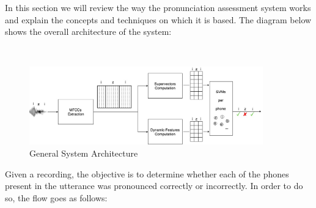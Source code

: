 In this section we will review the way the pronunciation assessment system works
and explain the concepts and techniques on which it is based. The diagram below
shows the overall architecture of the system:

~

\begin{figure}[H]
	\centering
	\includegraphics[width=0.9\textwidth]{files/figures/method/arquitectura_sistema_compuesto_v4.jpg}
	\caption{General System Architecture}
	\label{fig:methodGeneralArchitecture}
\end{figure}

Given a recording, the objective is to determine whether each of the phones
present in the utterance was pronounced correctly or incorrectly.
In order to do so, the flow goes as follows:

